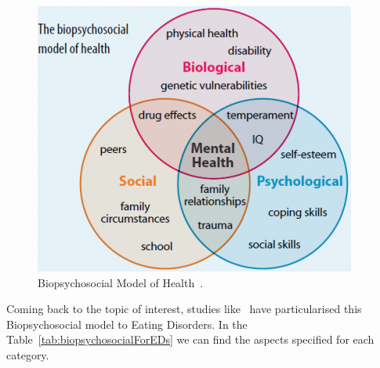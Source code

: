 \begin{figure}[!htp]
    \centering
    \includegraphics[scale=0.6]{img/state-of-art/biopsychosocial model.png}
    \caption{Biopsychosocial Model of Health~\cite{Biopsych52:online}.}
    \label{fig:biopsychosocial}
\end{figure}

Coming back to the topic of interest, studies like~\cite{WhatCaus58:online} have particularised this Biopsychosocial model to Eating Disorders. In the Table~\ref{tab:biopsychosocialForEDs} we can find the aspects specified for each category.


